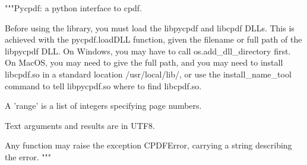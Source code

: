 """Pycpdf: a python interface to cpdf.

Before using the library, you must load the libpycpdf and libcpdf DLLs. This is
achieved with the pycpdf.loadDLL function, given the filename or full path of
the libpycpdf DLL.  On Windows, you may have to call os.add_dll_directory
first. On MacOS, you may need to give the full path, and you may need to
install libcpdf.so in a standard location /usr/local/lib/, or use the
install_name_tool command to tell libpycpdf.so where to find libcpdf.so.

A 'range' is a list of integers specifying page numbers.

Text arguments and results are in UTF8.

Any function may raise the exception CPDFError, carrying a string describing
the error. """
